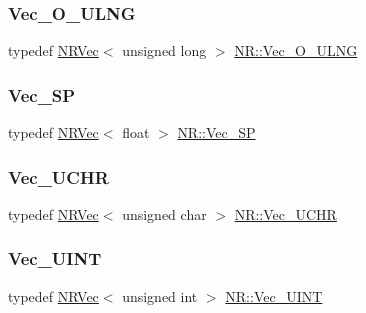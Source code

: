 \mbox{\label{namespaceNR_a111b6302e9ace403b90a1d801f0c70a2}} 
\subsubsection{\texorpdfstring{Vec\_O\_ULNG}{Vec\_O\_ULNG}}
{\footnotesize\ttfamily typedef \mbox{\hyperlink{classNR_1_1NRVec}{N\+R\+Vec}}$<$ unsigned long $>$ \mbox{\hyperlink{namespaceNR_a111b6302e9ace403b90a1d801f0c70a2}{N\+R\+::\+Vec\+\_\+\+O\+\_\+\+U\+L\+NG}}}

\mbox{\label{namespaceNR_af83af2cf4cf885729545ae16ad25607b}} 
\subsubsection{\texorpdfstring{Vec\_SP}{Vec\_SP}}
{\footnotesize\ttfamily typedef \mbox{\hyperlink{classNR_1_1NRVec}{N\+R\+Vec}}$<$ float $>$ \mbox{\hyperlink{namespaceNR_af83af2cf4cf885729545ae16ad25607b}{N\+R\+::\+Vec\+\_\+\+SP}}}

\mbox{\label{namespaceNR_a75ba1edf4fe4133a3ecb94b7c1a90f20}} 
\subsubsection{\texorpdfstring{Vec\_UCHR}{Vec\_UCHR}}
{\footnotesize\ttfamily typedef \mbox{\hyperlink{classNR_1_1NRVec}{N\+R\+Vec}}$<$ unsigned char $>$ \mbox{\hyperlink{namespaceNR_a75ba1edf4fe4133a3ecb94b7c1a90f20}{N\+R\+::\+Vec\+\_\+\+U\+C\+HR}}}

\mbox{\label{namespaceNR_a891b8cd2a3c0e5ce8bd7c605dba2bdd1}} 
\subsubsection{\texorpdfstring{Vec\_UINT}{Vec\_UINT}}
{\footnotesize\ttfamily typedef \mbox{\hyperlink{classNR_1_1NRVec}{N\+R\+Vec}}$<$ unsigned int $>$ \mbox{\hyperlink{namespaceNR_a891b8cd2a3c0e5ce8bd7c605dba2bdd1}{N\+R\+::\+Vec\+\_\+\+U\+I\+NT}}}

\mbox{\label{namespaceNR_a5c7370f8964ba27e0aa18ff2b2516734}} 

